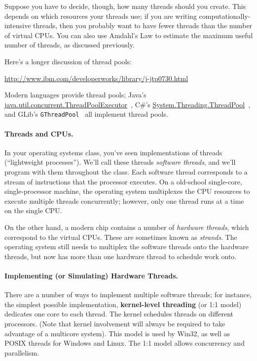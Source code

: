 \documentclass[a4paper]{report}
\begin{document}
Suppose you have to decide, though, how many threads should you create.
This depends
on which resources your threads use; if you are writing
computationally-intensive threads, then you probably want to have
fewer threads than the number of virtual CPUs. You can also use
Amdahl's Law to estimate the maximum useful number of threads, as
discussed previously.

Here's a longer discussion of thread pools:

\begin{center}
\url{http://www.ibm.com/developerworks/library/j-jtp0730.html}
\end{center}

Modern languages provide thread pools; Java's
\url{java.util.concurrent.ThreadPoolExecutor}~\cite{java:threadpoolexecutor}, C\#'s
\url{System.Threading.ThreadPool}~\cite{csharp:threadpool}, and GLib's {\tt GThreadPool}~\cite{gnome:threadpool} all implement thread pools. 

\paragraph{Threads and CPUs.} In your operating systems class,
you've seen implementations of threads (``lightweight processes'').
We'll call these threads \emph{software threads}, and we'll program
with them throughout the class. Each software thread corresponds to a
stream of instructions that the processor executes. On a old-school
single-core, single-processor machine, the operating system
multiplexes the CPU resources to execute multiple threads
concurrently; however, only one thread runs at a time on the single
CPU.

On the other hand, a modern chip contains a number of \emph{hardware
threads}, which correspond to the virtual CPUs. These are sometimes
known as \emph{strands}. The operating system still needs to 
multiplex the software threads onto the hardware threads, but now has
more than one hardware thread to schedule work onto.



\paragraph{Implementing (or Simulating) Hardware Threads.} 
There are a number of ways to implement multiple software threads; for
instance, the simplest possible implementation, {\bf kernel-level
threading} (or 1:1 model) dedicates one core to each thread. The kernel schedules threads
on different processors. (Note that kernel involvement will always be required to
take advantage of a multicore system). This model is used by Win32, as well as
POSIX threads for Windows and Linux. The 1:1 model allows concurrency and parallelism.
\end{document}
